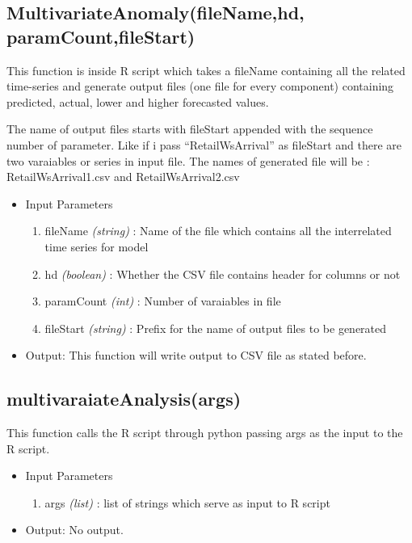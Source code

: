 \subsection{MultivariateAnomaly(fileName,hd, paramCount,fileStart)}

This function is inside R script which takes a fileName containing all the related 
time-series and generate output files (one file for every component) containing predicted, actual,
lower and higher forecasted values. 

The name of output files starts with fileStart appended with
the sequence number of parameter. Like if i pass ``RetailWsArrival'' as fileStart and there are 
two varaiables or series in input file. The names of generated file will be : RetailWsArrival1.csv and 
RetailWsArrival2.csv

\begin{itemize}
 \item Input Parameters
 
 \begin{enumerate}
  \item fileName \textit{(string)} : Name of the file which contains all the interrelated time series for model
  \item hd \textit{(boolean)} : Whether the CSV file contains header for columns or not 
  \item paramCount \textit{(int)} : Number of varaiables in file 
  \item fileStart \textit{(string)} : Prefix for the name of output files to be generated
  
 \end{enumerate}

 \item Output: This function will write output to CSV file as stated before.

\end{itemize}

\subsection{multivaraiateAnalysis(args)}

This function calls the R script through python passing args as the input to the R script.

\begin{itemize}
 \item Input Parameters
 
 \begin{enumerate}
  \item args \textit{(list)} : list of strings which serve as input to R script 

 \end{enumerate}

 \item Output: No output.

\end{itemize}

